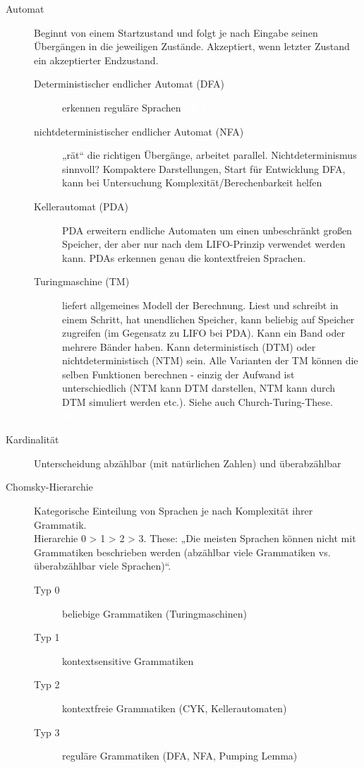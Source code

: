 \documentclass[a4paper,10pt]{article}
\newcommand{\vl}[1]{\colorbox{light-gray}{\textcolor{white}{\textbf{#1}}}}
\begin{document}
\begin{description}
        \item[Automat]
            Beginnt von einem Startzustand und folgt je nach Eingabe seinen Übergängen in die jeweiligen Zustände.
            Akzeptiert, wenn letzter Zustand ein akzeptierter Endzustand.
            \begin{description}
                \item[Deterministischer endlicher Automat (DFA)] erkennen reguläre Sprachen \vl{FS 3}
                \item[nichtdeterministischer endlicher Automat (NFA)] „rät“ die richtigen Übergänge, arbeitet parallel. Nichtdeterminismus sinnvoll? Kompaktere Darstellungen, Start für Entwicklung DFA, kann bei Untersuchung Komplexität/Berechenbarkeit helfen \vl{FS 4}
                \item[Kellerautomat (PDA)]
                    PDA erweitern endliche Automaten um einen unbeschränkt großen Speicher, der aber nur nach dem LIFO-Prinzip verwendet werden
                    kann. PDAs erkennen genau die kontextfreien Sprachen. \vl{FS 15}
                \item[Turingmaschine (TM)]
                    liefert allgemeines Modell der Berechnung. Liest und schreibt in einem Schritt, hat unendlichen
                    Speicher, kann beliebig auf Speicher zugreifen (im Gegensatz zu LIFO bei PDA).
                    Kann ein Band oder mehrere Bänder haben.
                    Kann deterministisch (DTM) oder nichtdeterministisch (NTM) sein.
                    Alle Varianten der TM können die selben Funktionen berechnen - einzig der Aufwand ist unterschiedlich (NTM kann DTM darstellen, NTM kann durch DTM simuliert werden etc.).
                    Siehe auch Church-Turing-These. \vl{FS 18}
            \end{description}


        \item[Kardinalität] Unterscheidung abzählbar (mit natürlichen Zahlen) und überabzählbar

        \item[Chomsky-Hierarchie]
            Kategorische Einteilung von Sprachen je nach Komplexität ihrer Grammatik. \\
            Hierarchie 0 > 1 > 2 > 3.
            These: „Die meisten Sprachen können nicht mit Grammatiken beschrieben
            werden (abzählbar viele Grammatiken vs. überabzählbar viele Sprachen)“. \vl{FS 2}
            \begin{description}
                \item[Typ 0] beliebige Grammatiken (Turingmaschinen)
                \item[Typ 1] kontextsensitive Grammatiken
                \item[Typ 2] kontextfreie Grammatiken (CYK, Kellerautomaten)
                \item[Typ 3] reguläre Grammatiken (DFA, NFA, Pumping Lemma)
            \end{description}


\end{description}
\end{document}
